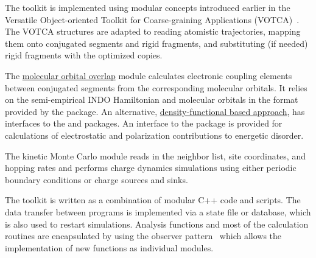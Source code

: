 The toolkit is implemented using modular concepts introduced earlier in the Versatile Object-oriented Toolkit for Coarse-graining Applications (VOTCA)~\cite{ruehle_versatile_2009}. The VOTCA structures are adapted to reading atomistic trajectories, mapping them onto conjugated segments and rigid fragments, and substituting (if needed) rigid fragments with the optimized copies. 

The \hyperref[sec:moo]{molecular orbital overlap} module calculates electronic coupling elements between  conjugated segments from the corresponding molecular orbitals. It relies on the semi-empirical INDO Hamiltonian and molecular orbitals in the format provided by the \gaussian package. An alternative,  \hyperref[sec:dft]{density-functional based approach}, has interfaces to the \gaussian and \turbomole packages. An interface to the \tinker package is provided for calculations of electrostatic and polarization contributions to energetic disorder. 

The kinetic Monte Carlo module reads in the neighbor list, site coordinates, and hopping rates and performs charge dynamics simulations using either periodic boundary conditions or charge sources and sinks. 

The toolkit is written as a combination of modular C++ code and scripts. The data transfer between programs is implemented via a state file or database, which is also used to restart simulations. Analysis functions and most of the calculation routines are encapsulated by using the observer pattern~\cite{gamma_design_1995} which allows the implementation of new functions as individual modules.